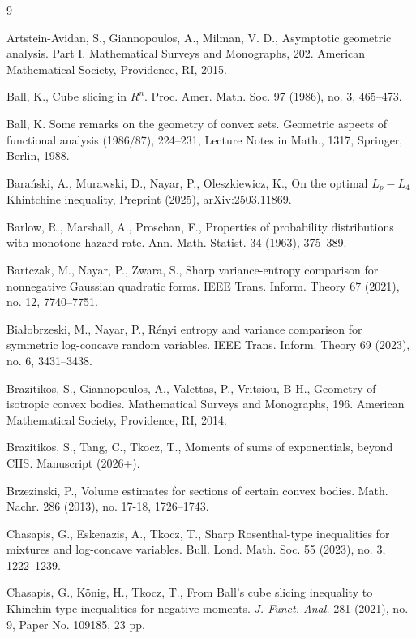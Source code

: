\documentclass[10pt]{amsart}
\newcommand{\1}{\textbf{1}}
\newcommand{\red}{}
\theoremstyle{remark}
\theoremstyle{definition}
\begin{document}
\begin{thebibliography}{9}




Artstein-Avidan, S., Giannopoulos, A., Milman, V. D., Asymptotic geometric analysis. Part I. Mathematical Surveys and Monographs, 202. American Mathematical Society, Providence, RI, 2015.


Ball, K.,
Cube slicing in $R^n$.
Proc. Amer. Math. Soc. 97 (1986), no. 3, 465--473.


Ball, K.
Some remarks on the geometry of convex sets. Geometric aspects of functional analysis (1986/87), 224--231, Lecture Notes in Math., 1317, Springer, Berlin, 1988.


Bara\'nski, A., Murawski, D., Nayar, P., Oleszkiewicz, K.,
On the optimal $L_p-L_4$ Khintchine inequality, Preprint (2025), arXiv:2503.11869.


Barlow, R., Marshall, A., Proschan, F.,
Properties of probability distributions with monotone hazard rate.
Ann. Math. Statist. 34 (1963), 375--389.


Bartczak, M., Nayar, P., Zwara, S., 
Sharp variance-entropy comparison for nonnegative Gaussian quadratic forms. 
IEEE Trans. Inform. Theory 67 (2021), no. 12, 7740--7751.


Bia\l obrzeski, M., Nayar, P., R\'enyi entropy and variance comparison for symmetric log-concave random variables. 
IEEE Trans. Inform. Theory 69 (2023), no. 6, 3431--3438.


Brazitikos, S., Giannopoulos, A., Valettas, P., Vritsiou, B-H., 
Geometry of isotropic convex bodies. Mathematical Surveys and Monographs, 196. American Mathematical Society, Providence, RI, 2014.

{\red 
{}
Brazitikos, S., Tang, C., Tkocz, T., Moments of sums of exponentials, beyond CHS. Manuscript (2026+).}


Brzezinski, P.,
Volume estimates for sections of certain convex bodies.
Math. Nachr. 286 (2013), no. 17-18, 1726--1743.




Chasapis, G., Eskenazis, A., Tkocz, T.,
Sharp Rosenthal-type inequalities for mixtures and log-concave variables.
Bull. Lond. Math. Soc. 55 (2023), no. 3, 1222--1239.


Chasapis, G., K\"onig, H., Tkocz, T., From Ball's cube slicing inequality to Khinchin-type inequalities for negative moments. \emph{J. Funct. Anal.} 281 (2021), no. 9, Paper No. 109185, 23 pp.



\end{thebibliography}
\end{document}

